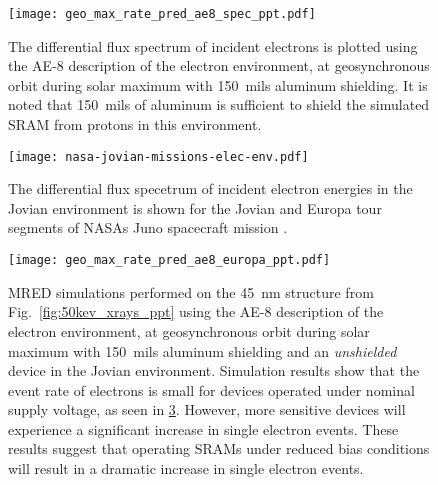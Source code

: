 \begin{figure}[htbp]
    \begin{center}
        \texttt{[image: geo\_max\_rate\_pred\_ae8\_spec\_ppt.pdf]}
    \end{center}
    \caption{The differential flux spectrum of incident electrons is plotted using the AE-8 description of the electron environment, at geosynchronous orbit during solar maximum with 150~mils aluminum shielding. It is noted that 150~mils of aluminum is sufficient to shield the simulated SRAM from protons in this environment.}
    \label{fig:ae8_spec_ppt}
\end{figure}

\begin{figure}[htbp]
    \begin{center}
        \texttt{[image: nasa-jovian-missions-elec-env.pdf]}
    \end{center}
    \caption{The differential flux specetrum of incident electron energies in the Jovian environment is shown for the Jovian and Europa tour segments of NASAs Juno spacecraft mission \cite{garrett2012galileo}.}
    \label{fig:nasa-jovian-missions-elec-env}
\end{figure}

\begin{figure}[htbp]
    \begin{center}
        \texttt{[image: geo\_max\_rate\_pred\_ae8\_europa\_ppt.pdf]}
    \end{center}
    \caption{MRED simulations performed on the 45~nm structure from Fig.~\ref{fig:50kev_xrays_ppt} using the AE-8 description of the electron environment, at geosynchronous orbit during solar maximum with 150~mils aluminum shielding and an \emph{unshielded} device in the Jovian environment. Simulation results show that the event rate of electrons is small for devices operated under nominal supply voltage, as seen in \ref{fig:geo_max_rate_pred_ae8_ppt}. However, more sensitive devices will experience a significant increase in single electron events. These results suggest that operating SRAMs under reduced bias conditions will result in a dramatic increase in single electron events.}
    \label{fig:geo_max_rate_pred_ae8_ppt}
\end{figure}

